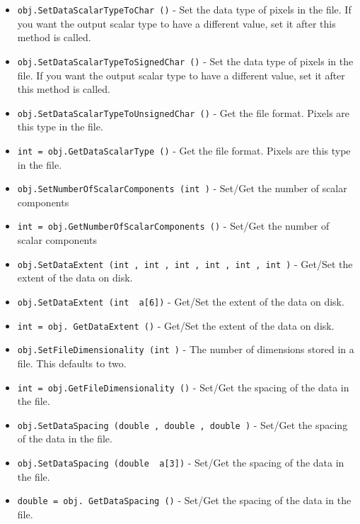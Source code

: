 \begin{itemize}
\item  \verb|obj.SetDataScalarTypeToChar ()| -  Set the data type of pixels in the file.  
 If you want the output scalar type to have a different value, set it
 after this method is called.

\item  \verb|obj.SetDataScalarTypeToSignedChar ()| -  Set the data type of pixels in the file.  
 If you want the output scalar type to have a different value, set it
 after this method is called.

\item  \verb|obj.SetDataScalarTypeToUnsignedChar ()| -  Get the file format.  Pixels are this type in the file.

\item  \verb|int = obj.GetDataScalarType ()| -  Get the file format.  Pixels are this type in the file.

\item  \verb|obj.SetNumberOfScalarComponents (int )| -  Set/Get the number of scalar components

\item  \verb|int = obj.GetNumberOfScalarComponents ()| -  Set/Get the number of scalar components

\item  \verb|obj.SetDataExtent (int , int , int , int , int , int )| -  Get/Set the extent of the data on disk.  

\item  \verb|obj.SetDataExtent (int  a[6])| -  Get/Set the extent of the data on disk.  

\item  \verb|int = obj. GetDataExtent ()| -  Get/Set the extent of the data on disk.  

\item  \verb|obj.SetFileDimensionality (int )| -  The number of dimensions stored in a file. This defaults to two.

\item  \verb|int = obj.GetFileDimensionality ()| -  Set/Get the spacing of the data in the file.

\item  \verb|obj.SetDataSpacing (double , double , double )| -  Set/Get the spacing of the data in the file.

\item  \verb|obj.SetDataSpacing (double  a[3])| -  Set/Get the spacing of the data in the file.

\item  \verb|double = obj. GetDataSpacing ()| -  Set/Get the spacing of the data in the file.


\end{itemize}
